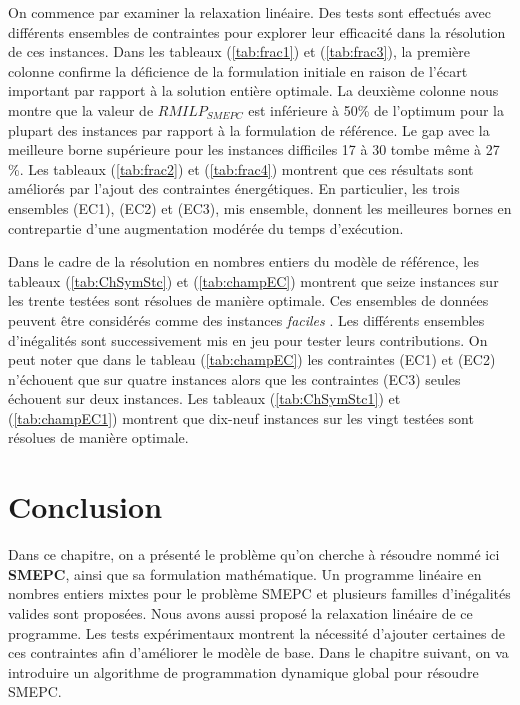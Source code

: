 {On commence par examiner la relaxation linéaire. Des tests sont effectués avec différents ensembles de contraintes pour explorer leur efficacité dans la résolution de ces instances. Dans les tableaux (\ref{tab:frac1}) et (\ref{tab:frac3}), la première colonne confirme la déficience de la formulation initiale en raison de l'écart important par rapport à la solution entière optimale. La deuxième colonne nous montre que la valeur de \textit{$RMILP_{SMEPC}$} est inférieure à 50\% de l'optimum pour la plupart des instances par rapport à la formulation de référence. Le gap avec la meilleure borne supérieure pour les instances difficiles 17 à 30 tombe même à 27 \%.  Les tableaux (\ref{tab:frac2}) et (\ref{tab:frac4}) montrent que ces résultats sont améliorés par l'ajout des contraintes énergétiques. En particulier, les trois ensembles (EC1), (EC2) et (EC3), mis ensemble, donnent les meilleures bornes en contrepartie d'une augmentation modérée du temps d'exécution.

Dans le cadre de la résolution en nombres entiers du modèle de référence, les tableaux (\ref{tab:ChSymStc}) et (\ref{tab:champEC}) montrent que seize instances sur les trente testées sont résolues de manière optimale. Ces ensembles de données peuvent être considérés comme des instances {\it faciles }. Les différents ensembles d'inégalités sont successivement mis en jeu pour tester leurs contributions. On peut noter que dans le tableau (\ref{tab:champEC}) les contraintes (EC1) et (EC2) n'échouent que sur quatre instances alors que les contraintes (EC3) seules échouent sur deux instances. %
 Les tableaux (\ref{tab:ChSymStc1}) et (\ref{tab:champEC1})  montrent que dix-neuf instances sur les vingt testées sont résolues de manière optimale.

\section{Conclusion}

Dans ce chapitre, on a présenté le problème qu'on cherche à résoudre nommé ici \textbf{SMEPC}, ainsi que sa formulation mathématique. Un programme linéaire en nombres entiers mixtes pour le problème SMEPC et plusieurs familles d'inégalités valides sont proposées. Nous avons aussi proposé la relaxation linéaire de ce programme. Les tests expérimentaux montrent la nécessité d'ajouter certaines de ces contraintes afin d'améliorer le modèle de base.
Dans le chapitre suivant, on va introduire un algorithme de programmation dynamique global pour résoudre SMEPC. %
}

